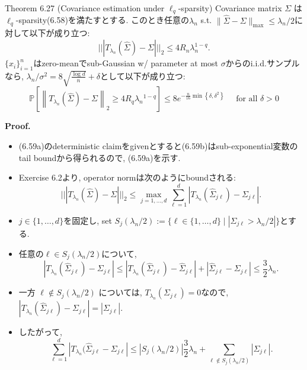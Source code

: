 \documentclass[unicode,aspectratio=169,11pt]{beamer}
\begin{document}
\begin{frame}
  \begin{block}{Theorem 6.27 (Covariance estimation under $\ell_q$-sparsity)}
    Covariance matrix $\Sigma$ は$\ell_q$-sparsity(6.58)を満たすとする.
    このとき任意の$\lambda_n$ s.t. $\|\widehat{\Sigma} - \Sigma\|_{\max} \le \lambda_n/2$に対して以下が成り立つ:
    \[
      |||T_{\lambda_n}(\widehat{\Sigma}) - \Sigma|||_2 \le 4 R_n \lambda_n^{1-q}.
      \tag{6.59a}
    \]
    $\{x_i\}_{i=1}^n$はzero-meanでsub-Gaussian w/ parameter at most $\sigma$からのi.i.d.サンプルなら,
    $\lambda_n/\sigma^2 = 8\sqrt{\frac{\log d}{n}} + \delta$として以下が成り立つ:
    \[
      \mathbb{P}\left[\left\|T_{\lambda_{n}}(\widehat{\Sigma})-\Sigma\right\|_{2} \geq 4 R_{q} \lambda_{n}{ }^{1-q}\right]
      \leq 8 e^{-\frac{n}{16} \min \left\{\delta, \delta^{2}\right\}} \quad \text { for all } \delta>0
      \tag{6.59b}
    \]
  \end{block}
\end{frame}

\begin{frame}{}{}
  {\bf Proof.}
  \begin{itemize}
    \item (6.59a)のdeterministic claimをgivenとすると(6.59b)はsub-exponential変数のtail boundから得られるので, (6.59a)を示す.
    \item Exercise 6.2より, operator normは次のようにboundされる:
          \[
            ||| T_{\lambda_n}(\widehat{\Sigma}) - \Sigma|||_2
            \le \max_{j = 1,\dots,d}\sum_{\ell = 1}^d|T_{\lambda_n}(\widehat{\Sigma}_{j\ell}) - \Sigma_{j\ell}|.
          \]
    \item $j \in\{1,\dots,d\}$を固定し, set $S_j(\lambda_n/2) := \{\ell \in \{1,\dots,d\}\mid |\Sigma_{j\ell} > \lambda_n/2|\}$とする.
    \item 任意の$\ell \in S_j(\lambda_n/2)$について,
          \[
            \left|T_{\lambda_{n}}\left(\widehat{\Sigma}_{j \ell}\right)-\Sigma_{j \ell}\right|
            \leq\left|T_{\lambda_{n}}\left(\widehat{\Sigma}_{j \ell}\right)-\widehat{\Sigma}_{j \ell}\right|+\left|\widehat{\Sigma}_{j \ell}-\Sigma_{j \ell}\right|
            \leq \frac{3}{2} \lambda_{n}.
          \]
    \item 一方 $\ell \notin S_j(\lambda_n/2)$ については, $T_{\lambda_n}(\Sigma_{j\ell}) = 0$なので,
          $
            |T_{\lambda_n}(\widehat{\Sigma}_{j\ell}) - \Sigma_{j\ell}| = |\Sigma_{j\ell}|.
          $
    \item したがって, 
          \[
            \sum_{\ell = 1}^d |T_{\lambda_n}(\widehat{\Sigma}_{j\ell} - \Sigma_{j\ell}|
            \le |S_j(\lambda_n/2)|\frac{3}{2}\lambda_n + \sum_{\ell \notin S_j(\lambda_n/2)}|\Sigma_{j\ell}|.
            \tag{6.60}
          \]
  \end{itemize}
\end{frame}
\end{document}
